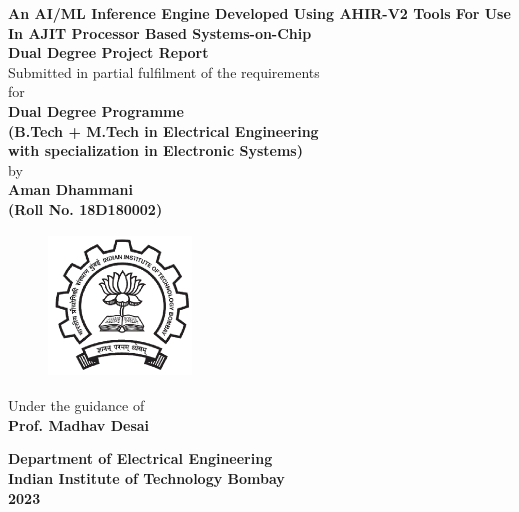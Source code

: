 \documentclass[a4paper,12pt, final]{report}
\begin{document}
  \thispagestyle{empty}
  \vspace*{1cm}
  {\centering     
  \textbf{\LARGE An AI/ML Inference Engine Developed Using AHIR-V2 Tools For Use In AJIT Processor Based Systems-on-Chip}\\
  \vspace{1.20cm}
  \textbf{\large Dual Degree Project Report}\\
  \vspace{1cm}
  {Submitted in partial fulfilment of the requirements}\\
  \vspace{0.25cm}
  {for}\\
  \vspace{1cm}
  \textbf{ Dual Degree Programme \\(B.Tech + M.Tech in Electrical Engineering \\with specialization in Electronic Systems)}\\
  \vspace{1.50cm}
  {by}\\
  \vspace{0.20cm}
  \textbf{\large Aman Dhammani}\\
  \vspace{0.25cm}
  \textbf{\large (Roll No. 18D180002)}\\
  \vspace{1.8cm}
    \begin{figure}[htb]
    \begin{center}
    \includegraphics[height=1.5in,width=1.5in]{iitblogo.png}
    \end{center}
    \end{figure}
  \vspace{1.450cm}
  {Under the guidance of}\\
  \vspace{0.20cm}
  \textbf{\large Prof. Madhav Desai}\\
    \vspace{0.30cm}

    
  {\textbf{Department of Electrical Engineering}}\\
  {\textbf{Indian Institute of Technology Bombay}}\\
  {\textbf{2023}}
 
 }
\end{document}
